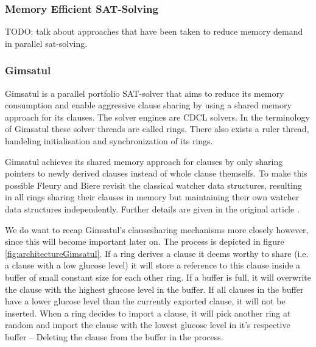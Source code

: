 \documentclass[12pt,a4paper,twoside]{scrartcl}
\numberwithin{equation}{section}
\begin{document}
\subsubsection{Memory Efficient SAT-Solving}

TODO: talk about approaches that have been taken to reduce memory demand in parallel sat-solving.

\subsubsection{Gimsatul}

Gimsatul \cite{gimsatul} is a parallel portfolio SAT-solver that aims to reduce its memory consumption and enable aggressive clause sharing by using a shared memory approach for its clauses. The solver engines are CDCL solvers. In the terminology of Gimsatul these solver threads are called rings. There also exists a ruler thread, handeling initialisation and synchronization of its rings.

Gimsatul achieves its shared memory approach for clauses by only sharing pointers to newly derived clauses instead of whole clause themselfs. To make this possible Fleury and Biere revisit the classical watcher data structures, resulting in all rings sharing their clauses in memory but maintaining their own watcher data structures independently. Further details are given in the original article \cite{gimsatul}.

We do want to recap Gimsatul's clausesharing mechanisms more closely however, since this will become important later on. The process is depicted in figure \ref{fig:architectureGimsatul}. If a ring derives a clause it deems worthy to share (i.e. a clause with a low glucose level) it will store a reference to this clause inside a buffer of small constant size for each other ring. If a buffer is full, it will overwrite the clause with the highest glucose level in the buffer. If all clauses in the buffer have a lower glucose level than the currently exported clause, it will not be inserted. When a ring decides to import a clause, it will pick another ring at random and import the clause with the lowest glucose level in it's respective buffer -- Deleting the clause from the buffer in the process.
\end{document}
